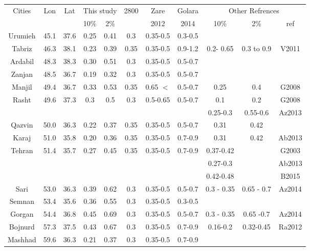 \begin{table}[!ht]
\begin{tabular}{ | c | c | c | c | c | c | c | c | c | c | c |}
	
	\multirow{2}{*}{Cities} & \multirow{2}{*}{Lon} & \multirow{2}{*}{Lat} & \multicolumn{2}{|c|}{This study} & \multirow{2}{*}{2800} & Zare & Golara &\multicolumn{3}{|c|}{Other Refrences}    \\ 
	\cline{4-5}  \cline{9-11}  &  &  & 10\% & 2\% &  &  2012 & 2014 & 10\% & 2\% & ref \\ \hline
	 Urumieh   & 45.1   & 37.6    & 0.25 & 0.41   & 0.3 & 0.35-0.5 & 0.3-0.5 &  &  &  \\ \hline
	 Tabriz       & 46.3    & 38.1   & 0.23 & 0.39   & 0.35 & 0.35-0.5 & 0.9-1.2& 0.2- 0.65 & 0.3 to 0.9 & V2011 \\ \hline
	 Ardabil      & 48.3   & 38.3   & 0.30 & 0.51    & 0.3 & 0.35-0.5 &0.5-0.7  &&  &  \\ \hline
	 Zanjan      & 48.5   & 36.7   & 0.19 & 0.32    & 0.3 & 0.35-0.5 &0.5-0.7  &&  &  \\ \hline
	 Manjil       & 49.4   & 36.7    & 0.33 & 0.53   & 0.35 & 0.65 $<$ &0.5-0.7& 0.25 & 0.4 & G2008 \\ \hline
	  \multirow{2}{*}{Rasht}  & \multirow{2}{*}{49.6} & \multirow{2}{*}{37.3} & \multirow{2}{*}{0.3} & \multirow{2}{*}{0.5} & \multirow{2}{*}{0.3} & \multirow{2}{*}{0.5-0.65} & \multirow{2}{*}{0.5-0.7} & 0.1 &  0.2 &  G2008 \\ 
	  \cline{9-11}	             &  &  &  &  &  &  & & 0.25-0.3 & 0.55-0.6 & Az2013\\ \hline
	 Qazvin     & 50.0   & 36.3    & 0.22 & 0.37   & 0.35 & 0.35-0.5 &0.5-0.7& 0.31 & 0.42 &  \\ \hline
	 Karaj        & 51.0   & 35.8    & 0.20 & 0.36   & 0.35 & 0.35-0.5 &0.7-0.9& 0.31 & 0.42 & Ab2013 \\ \hline
	 \multirow{3}{*}{Tehran}  & \multirow{3}{*}{51.4} & \multirow{3}{*}{35.7} & \multirow{3}{*}{0.27} & \multirow{3}{*}{0.45} & \multirow{3}{*}{0.35} & \multirow{3}{*}{0.35-0.5} & \multirow{3}{*}{0.7-0.9} & 0.37-0.42 &  &  G2003 \\ 
	 \cline{9-11}	             &  &  &  &  &  &  & & 0.27-0.3  &  & Ab2013\\ 
	 \cline{9-11}	             &  &  &  &  &  &  & & 0.42-0.48 &  & B2015\\ \hline
	 Sari          & 53.0   & 36.3   & 0.39   & 0.62  & 0.3 & 0.35-0.5 &0.5-0.7& 0.3 - 0.35 &  0.65 - 0.7 & Az2014\\ \hline
	 Semnan   & 53.4   & 35.6   & 0.36   & 0.55  & 0.3 & 0.35-0.5 &0.3-0.5&  & & \\ \hline
	 Gorgan    & 54.4   & 36.8    & 0.45  & 0.69  & 0.3 & 0.35-0.5 &0.5-0.7& 0.3 - 0.35 &  0.65 -0.7 & Az2014\\ \hline
	 Bojnurd   & 57.3    & 37.5    & 0.43  & 0.67  & 0.3 & 0.35-0.5 &0.7-0.9&0.16-0.2  & 0.32-0.45  & Ra2012  \\ \hline
	 Mashhad & 59.6     & 36.3   & 0.21 & 0.37  & 0.3 & 0.35-0.5 &0.7-0.9  &  &&  \\ \hline
 
\end{tabular}
\label{tab:pga_values}
\end{table}

